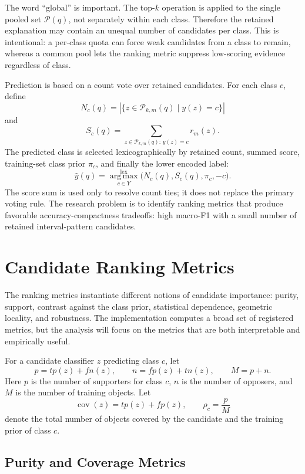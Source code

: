 \documentclass[11pt]{article}
\begin{document}
The word ``global'' is important. The top-$k$ operation is applied to the
single pooled set $\mathcal{P}(q)$, not separately within each class. Therefore
the retained explanation may contain an unequal number of candidates per class.
This is intentional: a per-class quota can force weak candidates from a class to
remain, whereas a common pool lets the ranking metric suppress low-scoring
evidence regardless of class.

Prediction is based on a count vote over retained candidates. For each class
$c$, define
\[
    N_c(q) = |\{z \in \mathcal{P}_{k,m}(q) \mid y(z)=c\}|
\]
and
\[
    S_c(q) = \sum_{z \in \mathcal{P}_{k,m}(q):\,y(z)=c} r_m(z).
\]
The predicted class is selected lexicographically by retained count, summed
score, training-set class prior $\pi_c$, and finally the lower encoded label:
\[
    \hat{y}(q) =
    \operatorname*{arg\,max}_{c \in Y}^{\mathrm{lex}}
    \bigl(N_c(q), S_c(q), \pi_c, -c\bigr).
\]
The score sum is used only to resolve count ties; it does not replace the
primary voting rule. The research problem is to identify ranking metrics that
produce favorable accuracy-compactness tradeoffs: high macro-F1 with a small
number of retained interval-pattern candidates.

\section{Candidate Ranking Metrics}

The ranking metrics instantiate different notions of candidate importance:
purity, support, contrast against the class prior, statistical dependence,
geometric locality, and robustness. The implementation computes a broad set of
registered metrics, but the analysis will focus on the metrics that are both
interpretable and empirically useful.

For a candidate classifier $z$ predicting class $c$, let
\[
    p = tp(z)+fn(z), \qquad n = fp(z)+tn(z), \qquad M=p+n.
\]
Here $p$ is the number of supporters for class $c$, $n$ is the number of
opposers, and $M$ is the number of training objects. Let
\[
    \operatorname{cov}(z)=tp(z)+fp(z), \qquad
    \rho_c=\frac{p}{M}
\]
denote the total number of objects covered by the candidate and the training
prior of class $c$.

\subsection{Purity and Coverage Metrics}
\end{document}
